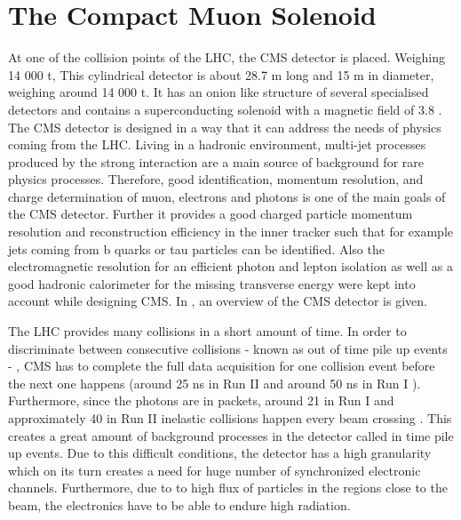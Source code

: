 \section{The Compact Muon Solenoid}
\label{sec:CMS}
At one of the collision points of the LHC, the CMS detector\cite{CMS, Bayatian:2006zz,Bayatian:922757} is placed. Weighing 14 000 \si{ \tonne}, This cylindrical detector is about 28.7 \si{ \meter} long and 15 \si{ \meter} in diameter, weighing around 14 000 \si{ \tonne}. It has an onion like structure of several specialised detectors and contains a superconducting solenoid with a magnetic field of 3.8 \si{ \Tesla}. The CMS detector is designed in a way that it can address the needs of physics coming from the LHC. Living in a hadronic environment, multi-jet processes produced by the strong interaction are a main source of background for rare physics processes. Therefore, good identification, momentum resolution, and charge determination of muon, electrons and photons is one of the main goals of the CMS detector. Further it provides a good charged particle momentum resolution and reconstruction efficiency in the inner tracker such that for example jets coming from b quarks or tau particles can be identified. Also the electromagnetic resolution for an efficient photon and lepton isolation as well as a good hadronic calorimeter for the missing transverse energy were kept into account while designing CMS. In , an overview of the CMS detector is given. 

The LHC provides many collisions in a short amount of time. In order to discriminate between consecutive collisions - known as out of time pile up events - , CMS has to complete the full data acquisition for one collision event before the next one happens (around 25 \si{ \nano \second} in Run II and around 50 \si{ \nano \second} in Run I \cite{OLuanaigh:2051986}). Furthermore, since the photons are in packets, around 21 in Run I and approximately 40 in Run II  inelastic collisions happen every beam crossing . This creates a great amount of background processes in the detector called in time pile up events. Due to this difficult conditions, the detector has a high granularity which on its turn creates a need for huge number of synchronized electronic channels. Furthermore, due to to high flux of particles in the regions close to the beam, the electronics have to be able to endure high radiation.


